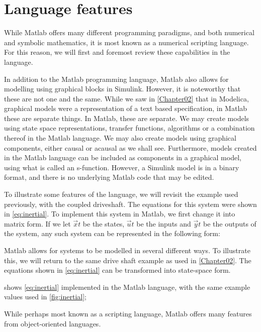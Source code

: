 \documentclass[\rootfolder/main.tex]{subfiles}
\begin{document}
\section{Language features}

While Matlab offers many different programming paradigms, and both numerical and symbolic mathematics, it is most known as a numerical scripting language.
For this reason, we will first and foremost review these capabilities in the language.

In addition to the Matlab programming language, Matlab also allows for modelling using graphical blocks in Simulink.
However, it is noteworthy that these are not one and the same.
While we saw in \ref{Chapter02} that in Modelica, graphical models were a representation of a text based specification, in Matlab these are separate things.
In Matlab, these are separate.
We may create models using state space representations, transfer functions, algorithms or a combination thereof in the Matlab language.
We may also create models using graphical components, either causal or acausal as we shall see.
Furthermore, models created in the Matlab language can be included as components in a graphical model, using what is called an s-function.
However, a Simulink model is in a binary format, and there is no underlying Matlab code that may be edited.

To illustrate some features of the language, we will revisit the example used previously, with the coupled driveshaft.
The equations for this system were shown in \cref{eq:inertial}.
To implement this system in Matlab, we first change it into matrix form.
If we let $\vec{x}{t}$ be the states, $\vec{u}{t}$ be the inputs and $\vec{y}{t}$ be the outputs of the system, any such system can be represented in the following form:


Matlab allows for systems to be modelled in several different ways.
To illustrate this, we will return to the same drive shaft example as used in \ref{Chapter02}.
The equations shown in \cref{eq:inertial} can be transformed into state-space form.

 shows \cref{eq:inertial} implemented in the Matlab language, with the same example values used in \cref{fig:inertial};

While perhaps most known as a scripting language, Matlab offers many features from object-oriented languages.
\end{document}
